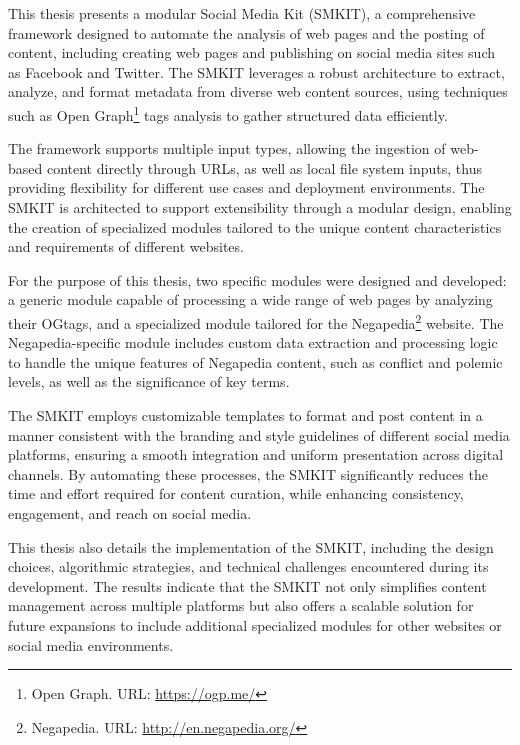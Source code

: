 
This thesis presents a modular Social Media Kit (SMKIT\addtoglossary), a comprehensive framework designed to automate the analysis of web pages and the posting of content, including creating web pages and publishing on social media sites such as Facebook and Twitter. The SMKIT leverages a robust architecture to extract, analyze, and format metadata from diverse web content sources, using techniques such as Open Graph\footnote{Open Graph. URL: \url{https://ogp.me/}} tags analysis to gather structured data efficiently. 

The framework supports multiple input types, allowing the ingestion of web-based content directly through URLs, as well as local file system inputs, thus providing flexibility for different use cases and deployment environments. The SMKIT is architected to support extensibility through a modular design, enabling the creation of specialized modules tailored to the unique content characteristics and requirements of different websites.

For the purpose of this thesis, two specific modules were designed and developed: a generic module capable of processing a wide range of web pages by analyzing their OG\addtoglossary tags, and a specialized module tailored for the Negapedia\footnote{Negapedia. URL: \url{http://en.negapedia.org/}} website. The Negapedia-specific module includes custom data extraction and processing logic to handle the unique features of Negapedia content, such as conflict and polemic levels, as well as the significance of key terms.

The SMKIT employs customizable templates to format and post content in a manner consistent with the branding and style guidelines of different social media platforms, ensuring a smooth integration and uniform presentation across digital channels. By automating these processes, the SMKIT significantly reduces the time and effort required for content curation, while enhancing consistency, engagement, and reach on social media.

This thesis also details the implementation of the SMKIT, including the design choices, algorithmic strategies, and technical challenges encountered during its development. The results indicate that the SMKIT not only simplifies content management across multiple platforms but also offers a scalable solution for future expansions to include additional specialized modules for other websites or social media environments.